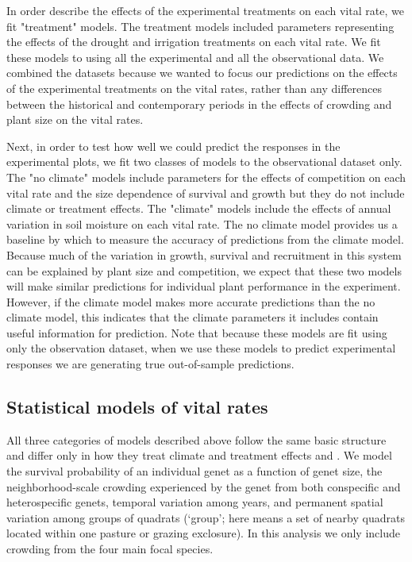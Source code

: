 \documentclass[11pt]{article}
\begin{document}
\begin{doublespace}
In order describe the effects of the experimental treatments on each vital rate, we fit "treatment" models. The treatment models included parameters representing the effects of the drought and irrigation treatments on each vital rate. We fit these models to using all the experimental and all the observational data. We combined the datasets because we wanted to focus our predictions on the effects of the experimental treatments on the vital rates, rather than any differences between the historical and contemporary periods in the effects of crowding and plant size on the vital rates. 

Next, in order to test how well we could predict the responses in the experimental plots, we fit two classes of models to the observational dataset only.  The "no climate" models include parameters for the effects of competition on each vital rate and the size dependence of survival and growth but they do not include climate or treatment effects. The "climate" models include the effects of annual variation in soil moisture on each vital rate. The no climate model provides us a baseline by which to measure the accuracy of predictions from the climate model. Because much of the variation in growth, survival and recruitment in this system can be explained by plant size and competition, we expect that these two models will make similar predictions for individual plant performance in the experiment.  However, if the climate model makes more accurate predictions than the no climate model, this indicates that the climate parameters it includes contain useful information for prediction. Note that because these models are fit using only the observation dataset, when we use  these models to predict experimental responses we are generating true out-of-sample predictions.
 
\subsection*{Statistical models of vital rates}

All three categories of models described above follow the same basic structure and differ only in how they treat climate and treatment effects and  \citep{adler_coexistence_2010,chu_large_2015}. We model the survival probability of an individual genet as a function of genet size, the neighborhood-scale crowding experienced by the genet from both conspecific and heterospecific genets, temporal variation among years, and permanent spatial variation among groups of quadrats (`group'; here means a set of nearby quadrats located within one pasture or grazing exclosure). In this analysis we only include crowding from the four main focal species. 


\end{doublespace}
\end{document}
